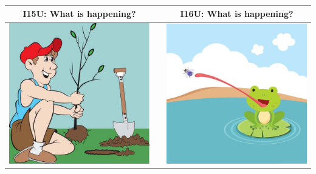 \documentclass[12pt,notitlepage]{article}
\begin{document}
\begin{center}
\begin{tabular}{|c|c|c|}
\hline
I15U: What is happening? && I16U: What is happening? \\
\hline
\includegraphics[width=20em,trim=0 0 0 -3]{figures/I15.jpg} & & \includegraphics[width=20em,trim=0 0 0 -3]{figures/I16.jpg} \\
\hline
\end{tabular}
\vspace{1em} \\



\end{center}
\end{document}
